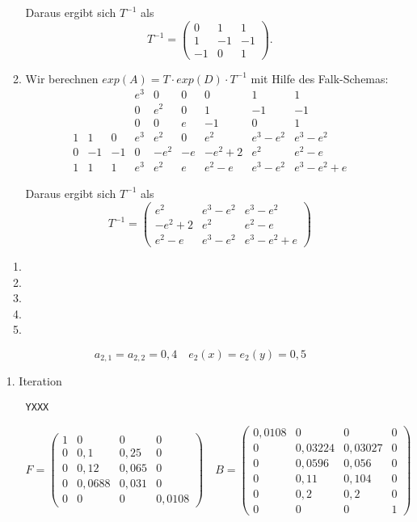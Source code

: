 \documentclass{homework}
\begin{document}
\begin{enumerate}
\begin{enumerate}
Daraus ergibt sich $T^{-1}$ als
$$T^{-1} = \begin{pmatrix}0 & 1 & 1\\1 & -1 & -1\\ -1 & 0 & 1\end{pmatrix}.$$

\item Wir berechnen $exp(A) = T \cdot exp(D) \cdot T^{-1}$ mit Hilfe des Falk-Schemas:
$$
\begin{array}{ccc|ccc|ccc}
 & & & e^3 & 0 & 0 & 0 & 1 & 1\\
 & & & 0 & e^2 & 0 & 1 & -1 & -1\\
 & & & 0 & 0 & e & -1 & 0 & 1\\\hline
1 & 1 & 0 & e^3 & e^2 & 0 & e^2 & e^3-e^2 & e^3-e^2\\
0 & -1 & -1 & 0 & -e^2 & -e & -e^2+2 & e^2 & e^2-e\\
1 & 1 & 1 & e^3 & e^2 & e & e^2-e & e^3-e^2 & e^3-e^2+e
\end{array}
$$

Daraus ergibt sich $T^{-1}$ als
$$T^{-1} = \begin{pmatrix}
e^2 & e^3-e^2 & e^3-e^2\\
-e^2+2 & e^2 & e^2-e\\
e^2-e & e^3-e^2 & e^3-e^2+e
\end{pmatrix}$$

\end{enumerate}

\begin{enumerate}
\item
\item
\item
\item
\item
\end{enumerate}


$$a_{2,1} = a_{2,2} = 0,4 \quad e_2(x) = e_2(y) = 0,5$$

1. Iteration

\begin{itemize}
\item[\texttt{YXXX}]

$$F = \begin{pmatrix}
1 & 0 & 0 & 0\\
0 & 0,1 & 0,25 & 0\\
0 & 0,12 & 0,065 & 0\\
0 & 0,0688 & 0,031 & 0\\
0 & 0 & 0 & 0,0108
\end{pmatrix}
\quad
B = \begin{pmatrix}
0,0108 & 0 & 0 & 0\\
0 & 0,03224 & 0,03027 & 0\\
0 & 0,0596 & 0,056 & 0\\
0 & 0,11 & 0,104 & 0\\
0 & 0,2 & 0,2 & 0\\
0 & 0 & 0 & 1
\end{pmatrix}$$


\end{itemize}
\end{enumerate}
\end{document}
